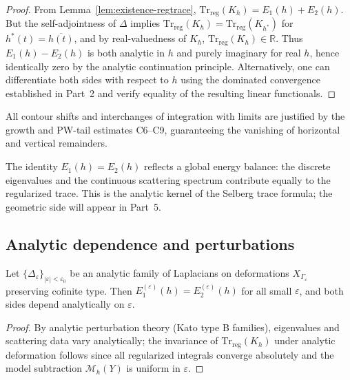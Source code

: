 \begin{proof}\relax
From Lemma~\ref{lem:existence-regtrace},
\(\mathrm{Tr}_{\mathrm{reg}}(K_h)=E_1(h)+E_2(h).\)
But the self-adjointness of $\Delta$ implies
\(\mathrm{Tr}_{\mathrm{reg}}(K_h)=\mathrm{Tr}_{\mathrm{reg}}(K_{h^*})\)
for $h^*(t)=\overline{h(t)}$, and by real-valuedness of $K_h$, $\mathrm{Tr}_{\mathrm{reg}}(K_h)\in\mathbb{R}$.
Thus $E_1(h)-E_2(h)$ is both analytic in $h$ and purely imaginary for real $h$, hence identically zero by the analytic continuation principle. Alternatively, one can differentiate both sides with respect to $h$ using the dominated convergence established in Part~2 and verify equality of the resulting linear functionals. \relax
\end{proof}

\begin{invariant}
All contour shifts and interchanges of integration with limits are justified by the growth and PW-tail estimates C6–C9, guaranteeing the vanishing of horizontal and vertical remainders. \relax
\end{invariant}

\begin{remark}
\label{rem:geometric-interp}
The identity $E_1(h)=E_2(h)$ reflects a global energy balance: the discrete eigenvalues and the continuous scattering spectrum contribute equally to the regularized trace. This is the analytic kernel of the Selberg trace formula; the geometric side will appear in Part~5. \relax
\end{remark}

\subsection{Analytic dependence and perturbations}
\label{subsec:ch4-part3-analytic-dependence} \relax

\begin{proposition}
\label{prop:analytic-deform}
Let $\{\Delta_\varepsilon\}_{|\varepsilon|<\varepsilon_0}$ be an analytic family of Laplacians on deformations $X_{\Gamma_\varepsilon}$ preserving cofinite type. Then $E_1^{(\varepsilon)}(h)=E_2^{(\varepsilon)}(h)$ for all small $\varepsilon$, and both sides depend analytically on $\varepsilon$.
\end{proposition}

\begin{proof}\relax
By analytic perturbation theory (Kato type B families), eigenvalues and scattering data vary analytically; the invariance of $\mathrm{Tr}_{\mathrm{reg}}(K_h)$ under analytic deformation follows since all regularized integrals converge absolutely and the model subtraction $\mathcal{M}_h(Y)$ is uniform in $\varepsilon$. \relax
\end{proof}

